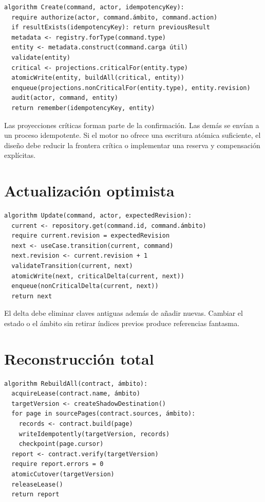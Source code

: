 \begin{verbatim}
algorithm Create(command, actor, idempotencyKey):
  require authorize(actor, command.ámbito, command.action)
  if resultExists(idempotencyKey): return previousResult
  metadata <- registry.forType(command.type)
  entity <- metadata.construct(command.carga útil)
  validate(entity)
  critical <- projections.criticalFor(entity.type)
  atomicWrite(entity, buildAll(critical, entity))
  enqueue(projections.nonCriticalFor(entity.type), entity.revision)
  audit(actor, command, entity)
  return remember(idempotencyKey, entity)
\end{verbatim}

Las proyecciones críticas forman parte de la confirmación. Las demás se envían a un
proceso idempotente. Si el motor no ofrece una escritura atómica suficiente, el diseño
debe reducir la frontera crítica o implementar una reserva y compensación explícitas.

\section{Actualización optimista}

\begin{verbatim}
algorithm Update(command, actor, expectedRevision):
  current <- repository.get(command.id, command.ámbito)
  require current.revision = expectedRevision
  next <- useCase.transition(current, command)
  next.revision <- current.revision + 1
  validateTransition(current, next)
  atomicWrite(next, criticalDelta(current, next))
  enqueue(nonCriticalDelta(current, next))
  return next
\end{verbatim}

El delta debe eliminar claves antiguas además de añadir nuevas. Cambiar el estado o el
ámbito sin retirar índices previos produce referencias fantasma.

\section{Reconstrucción total}

\begin{verbatim}
algorithm RebuildAll(contract, ámbito):
  acquireLease(contract.name, ámbito)
  targetVersion <- createShadowDestination()
  for page in sourcePages(contract.sources, ámbito):
    records <- contract.build(page)
    writeIdempotently(targetVersion, records)
    checkpoint(page.cursor)
  report <- contract.verify(targetVersion)
  require report.errors = 0
  atomicCutover(targetVersion)
  releaseLease()
  return report
\end{verbatim}

